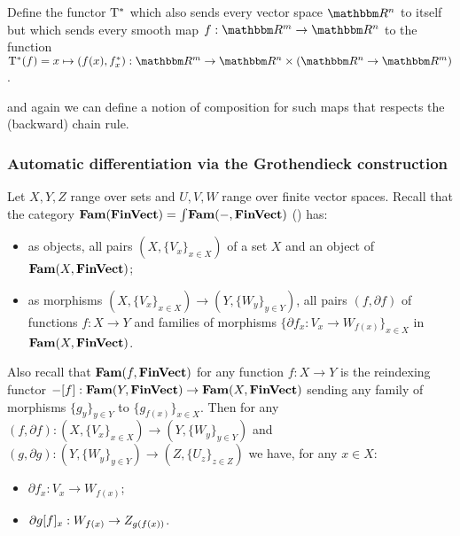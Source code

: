 \begin{definition}
Define the functor $\mathrm{T}^*$ which also sends every vector space $\RR^n$ to itself but which sends every
smooth map $f: \RR^m \to \RR^n$ to the function $\tangents^*(f) = x \mapsto (f(x), \pullf{f}_x): \RR^m \to
\RR^n \times (\RR^n \to \RR^m)$.
\end{definition}

\noindent and again we can define a notion of composition for such maps that respects the (backward) chain
rule.

\subsubsection{Automatic differentiation via the Grothendieck construction}

Let $X, Y, Z$ range over sets and $U, V, W$ range over finite vector spaces. Recall that the category
$\mathbf{Fam}(\mathbf{FinVect}) = \int_{}\mathbf{Fam}(-, \mathbf{FinVect})$ () has:
\begin{itemize}
\item as objects, all pairs $(X, \{V_x\}_{x \in X})$ of a set $X$ and an object of $\mathbf{Fam}(X,\mathbf{FinVect})$;
\item as morphisms $(X, \{V_x\}_{x \in X}) \to (Y, \{W_y\}_{y \in Y})$, all pairs $(f, \partial f)$ of
functions $f: X \to Y$ and families of morphisms $\{\partial f_x: V_x \to W_{f(x)}\}_{x \in X}$
in $\mathbf{Fam}(X,\mathbf{FinVect})$.
\end{itemize}

\noindent Also recall that $\mathbf{Fam}(f, \mathbf{FinVect})$ for any function $f: X \to Y$ is the reindexing functor
$-[f]: \mathbf{Fam}(Y, \mathbf{FinVect}) \to \mathbf{Fam}(X, \mathbf{FinVect})$ sending any family of morphisms $\{g_y\}_{y \in Y}$
to $\{g_{f(x)}\}_{x \in X}$. Then for any $(f, \partial f): (X, \{V_x\}_{x \in X}) \to (Y, \{W_y\}_{y \in Y})$
and $(g, \partial g): (Y, \{W_y\}_{y \in Y}) \to (Z, \{U_z\}_{z \in Z})$ we have, for any $x \in X$:
\begin{itemize}
\item $\partial f_x: V_x \to W_{f(x)}$;
\item $\partial g[f]_x: W_{f(x)} \to Z_{g(f(x))}$.
\end{itemize}
